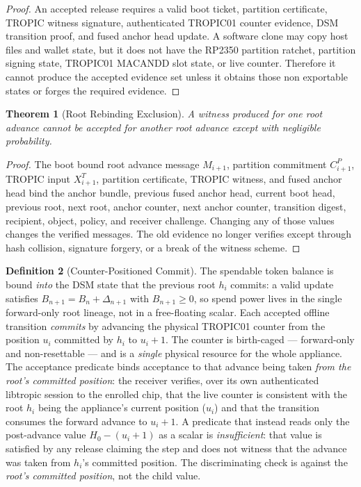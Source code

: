 \documentclass[11pt]{article}
\newtheorem{theorem}{Theorem}
\theoremstyle{definition}
\newtheorem{definition}[theorem]{Definition}
\theoremstyle{remark}
\begin{document}
\begin{proof}
An accepted release requires a valid boot ticket, partition certificate, TROPIC witness signature,
authenticated TROPIC01 counter evidence, DSM transition proof, and fused anchor head update. A
software clone may copy host files and wallet state, but it does not have the RP2350 partition
ratchet, partition signing state, TROPIC01 MACANDD slot state, or live counter. Therefore it cannot
produce the accepted evidence set unless it obtains those non exportable states or forges the
required evidence.
\end{proof}

\begin{theorem}[Root Rebinding Exclusion]
A witness produced for one root advance cannot be accepted for another root advance except with
negligible probability.
\end{theorem}

\begin{proof}
The boot bound root advance message \(M_{i+1}\), partition commitment \(C^P_{i+1}\), TROPIC input
\(X^T_{i+1}\), partition certificate, TROPIC witness, and fused anchor head bind the anchor bundle,
previous fused anchor head, current boot head, previous root, next root, anchor counter, next
anchor counter, transition digest, recipient, object, policy, and receiver challenge. Changing any
of those values changes the verified messages. The old evidence no longer verifies except through
hash collision, signature forgery, or a break of the witness scheme.
\end{proof}

\begin{definition}[Counter-Positioned Commit]
The spendable token balance is bound \emph{into} the DSM state that the previous root \(h_i\) commits:
a valid update satisfies \(B_{n+1}=B_n+\Delta_{n+1}\) with \(B_{n+1}\ge 0\), so spend power lives in the
single forward-only root lineage, not in a free-floating scalar. Each accepted offline transition
\emph{commits} by advancing the physical TROPIC01 counter from the position \(u_i\) committed by
\(h_i\) to \(u_i+1\). The counter is birth-caged --- forward-only and non-resettable --- and is a
\emph{single} physical resource for the whole appliance. The acceptance predicate binds acceptance to
that advance being taken \emph{from the root's committed position}: the receiver verifies, over its
own authenticated libtropic session to the enrolled chip, that the live counter is consistent with the
root \(h_i\) being the appliance's current position (\(u_i\)) and that the transition consumes the
forward advance to \(u_i+1\). A predicate that instead reads only the post-advance value
\(H_0-(u_i+1)\) as a scalar is \emph{insufficient}: that value is satisfied by any release claiming the
step and does not witness that the advance was taken from \(h_i\)'s committed position. The
discriminating check is against the \emph{root's committed position}, not the child value.
\end{definition}
\end{document}
